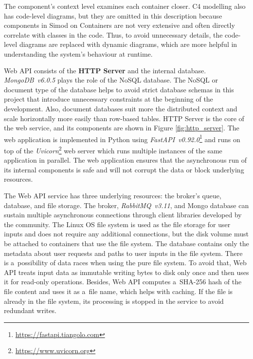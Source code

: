 \documentclass[12pt]{article}
\begin{document}
The component's context level examines each container closer. C4 modelling also has code-level diagrams, but they are omitted in this description because components in Simod on Containers are not very extensive and often directly correlate with classes in the code. Thus, to avoid unnecessary details, the code-level diagrams are replaced with dynamic diagrams, which are more helpful in understanding the system's behaviour at runtime.

Web API consists of the \textbf{HTTP Server} and the internal database. \emph{MongoDB~v6.0.5} plays the role of the NoSQL database. The NoSQL or document type of the database helps to avoid strict database schemas in this project that introduce unnecessary constraints at the beginning of the development. Also, document databases suit more the distributed context and scale horizontally more easily than row-based tables. HTTP Server is the core of the web service, and its components are shown in Figure \ref{fig:http_server}. The web application is implemented in Python using \emph{FastAPI~v0.92.0}\footnote{\href{https://fastapi.tiangolo.com}{https://fastapi.tiangolo.com}} and runs on top of the \emph{Uvicorn}\footnote{\href{https://www.uvicorn.org}{https://www.uvicorn.org}} web server which runs multiple instances of the same application in parallel. The web application ensures that the asynchronous run of its internal components is safe and will not corrupt the data or block underlying resources. 

The Web API service has three underlying resources: the broker's queue, database, and file storage. The broker, \emph{RabbitMQ~v3.11}, and Mongo database can sustain multiple asynchronous connections through client libraries developed by the community. The Linux OS file system is used as the file storage for user inputs and does not require any additional connections, but the disk volume must be attached to containers that use the file system. The database contains only the metadata about user requests and paths to user inputs in the file system. There is a~possibility of data races when using the pure file system. To avoid that, Web API treats input data as immutable writing bytes to disk only once and then uses it for read-only operations. Besides, Web API computes a~SHA-256 hash of the file content and uses it as a~file name, which helps with caching. If the file is already in the file system, its processing is stopped in the service to avoid redundant writes.
\end{document}
